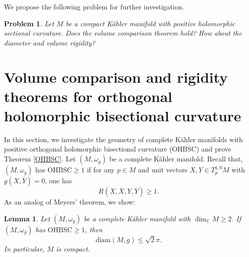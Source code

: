 \documentclass[12pt]{amsart}
\theoremstyle{plain}
\newtheorem{lemma}[thm]{Lemma}
\newtheorem{problem}[thm]{Problem}
\theoremstyle{definition}
\newcommand{\elemma}{\end{lemma}}
\newcommand{\blemma}{\begin{lemma}}
\renewcommand{\bar}{\overline}
\newcommand{\beq}{\begin{equation}}
\newcommand{\eeq}{\end{equation}}
\renewcommand{\>}{\rightarrow}
\newcommand{\C}{{\mathbb C}}
\newcommand{\om}{\omega}
\numberwithin{equation}{section} %
\begin{document}
	
	\baselineskip 
	\noindent We propose the following problem for further investigation.
	
	\begin{problem}\label{HSC} Let $M$ be a compact K\"ahler manifold with positive holomorphic sectional curvature. Does the  volume comparison  theorem hold? How about the diameter and volume rigidity? 
	\end{problem}
	
	
	
	
	\baselineskip

	\section{Volume comparison and rigidity  theorems for orthogonal holomorphic bisectional curvature}

In this section, we investigate the geometry of  complete K\"ahler manifolds with positive orthogonal holomorphic bisectional curvature (OHBSC) and prove Theorem \ref{OHBSC}. Let $(M,\omega_g)$ be a complete K\"ahler manifold. Recall that, $(M,\omega_g)$ has $\mathrm{OHBSC}\geq 1$ if for any $p\in M$ and  unit vectors $X,Y\in T^{1,0}_pM$ with $g(X,\bar Y)=0$, one has 
\beq R(X,\bar X, Y,\bar Y)\geq 1.\eeq 
As an analog of Meyers' theorem, we show:
\blemma\label{lem OHBSC compact}
Let $(M,\om_g)$ be a complete K\"ahler manifold with $\dim_\C M\geq 2$.  If $(M,\om_g)$ has $\mathrm{OHBSC}\geq 1$, then $$\mathrm{diam}(M,g)\leq \sqrt 2\pi.$$
In particular,  $M$ is compact.
\elemma
\end{document}
